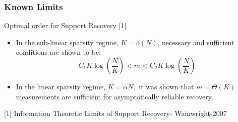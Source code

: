 \begin{frame}\frametitle{Known Limits}
\begin{block}{Optimal order for Support Recovery [1]}
\begin{itemize}
\item In the sub-linear sparsity regime, $K=o(N)$, necessary and sufficient conditions are shown to be:
\begin{equation*}
C_1 K\log\left(\frac{N}{K}\right)<m<C_2 K\log\left(\frac{N}{K}\right)
\end{equation*}
\item In the linear sparsity regime, $K=\alpha N,$ it was shown that $m=\Theta(K)$ measurements are sufficient for asymptotically reliable recovery. 
 \end{itemize}
\end{block}
\vspace{7ex}


[1] Information Theoretic Limits of Support Recovery- Wainwright-2007
\end{frame}


